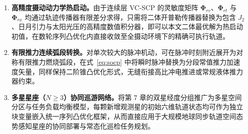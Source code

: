 \begin{enumerate}
  \item \textbf{高精度摄动动力学热启动。}由于连续层 VC-SCP 的灵敏度矩阵 $\bm\Phi_{rv}$、$\bm\Phi_{rt}$ 与 $\bm\Phi_{rx}$ 均通过轨迹传播器有限差分求得，只需将二体开普勒传播器替换为包含 $J_2$、日月引力与太阳光压的高精度数值积分器，即可以本文二体最优解为热启动初值，在数轮序列凸优化内直接收敛至全摄动环境下的精确可执行轨道。
  \item \textbf{有限推力连续弧段转换。}对单次较大的脉冲机动，可在脉冲时刻附近展开为对称有限推力燃烧弧段，在式~\eqref{eq:socp} 中将瞬时脉冲替换为分段常值推力加速度矢量，同样保持二阶锥凸优化形式，无缝衔接高比冲电推进或常规液体推力器约束。
  \item \textbf{多星星座（$N \ge 3$）协同巡游网络。}将第 7 章的双星经度分组推广为多星空间分区与任务负载均衡模型，每颗新增观测星的初始六维轨道状态均可作为独立块变量嵌入统一序列凸优化框架，从而直接应用于大规模地球同步轨道空间态势感知星座的协同部署与常态化巡检任务规划。
\end{enumerate}
